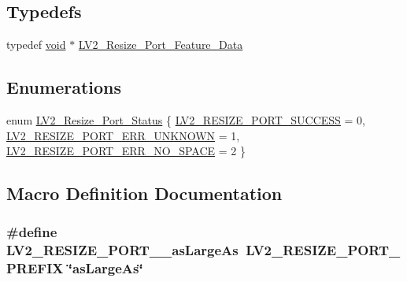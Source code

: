 \subsection*{Typedefs}
\begin{DoxyCompactItemize}
\item 
typedef \hyperlink{sound_8c_ae35f5844602719cf66324f4de2a658b3}{void} $\ast$ \hyperlink{resize-port_8h_abcf71f3dca55343488d9bd36e71d2392}{L\+V2\+\_\+\+Resize\+\_\+\+Port\+\_\+\+Feature\+\_\+\+Data}
\end{DoxyCompactItemize}
\subsection*{Enumerations}
\begin{DoxyCompactItemize}
\item 
enum \hyperlink{resize-port_8h_a71a46a5f08e889faa1b5b737bd2bcc16}{L\+V2\+\_\+\+Resize\+\_\+\+Port\+\_\+\+Status} \{ \hyperlink{resize-port_8h_a71a46a5f08e889faa1b5b737bd2bcc16aecdaee785a60c3c8823c6f17b1eac120}{L\+V2\+\_\+\+R\+E\+S\+I\+Z\+E\+\_\+\+P\+O\+R\+T\+\_\+\+S\+U\+C\+C\+E\+SS} = 0, 
\hyperlink{resize-port_8h_a71a46a5f08e889faa1b5b737bd2bcc16a2500a86b0b65a31a1cae721074638ec0}{L\+V2\+\_\+\+R\+E\+S\+I\+Z\+E\+\_\+\+P\+O\+R\+T\+\_\+\+E\+R\+R\+\_\+\+U\+N\+K\+N\+O\+WN} = 1, 
\hyperlink{resize-port_8h_a71a46a5f08e889faa1b5b737bd2bcc16ade6838fc80b9bb40c49a0b6920c26718}{L\+V2\+\_\+\+R\+E\+S\+I\+Z\+E\+\_\+\+P\+O\+R\+T\+\_\+\+E\+R\+R\+\_\+\+N\+O\+\_\+\+S\+P\+A\+CE} = 2
 \}
\end{DoxyCompactItemize}


\subsection{Macro Definition Documentation}
\subsubsection[{\texorpdfstring{L\+V2\+\_\+\+R\+E\+S\+I\+Z\+E\+\_\+\+P\+O\+R\+T\+\_\+\+\_\+as\+Large\+As}{LV2_RESIZE_PORT__asLargeAs}}]{\setlength{\rightskip}{0pt plus 5cm}\#define L\+V2\+\_\+\+R\+E\+S\+I\+Z\+E\+\_\+\+P\+O\+R\+T\+\_\+\+\_\+as\+Large\+As~{\bf L\+V2\+\_\+\+R\+E\+S\+I\+Z\+E\+\_\+\+P\+O\+R\+T\+\_\+\+P\+R\+E\+F\+IX} \char`\"{}as\+Large\+As\char`\"{}}\hypertarget{resize-port_8h_ab1a08f5819bb23fa4d3bd726d59df662}{}\label{resize-port_8h_ab1a08f5819bb23fa4d3bd726d59df662}


